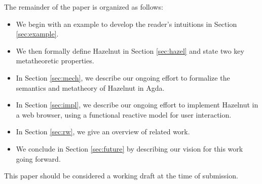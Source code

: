The remainder of the paper is organized as follows:
\begin{itemize}
  \item We begin with an example to develop the reader's intuitions in Section
    \ref{sec:example}.

  \item We then formally define Hazelnut in Section \ref{sec:hazel} and state two key metatheoretic properties.

  \item In Section \ref{sec:mech}, we describe our ongoing effort to formalize the semantics and metatheory of Hazelnut in Agda.

  \item In Section \ref{sec:impl}, we describe our ongoing effort to implement Hazelnut in a web browser, using a functional reactive model for user interaction.
  \item In Section \ref{sec:rw}, we give an overview of related work.
  \item We conclude in Section \ref{sec:future} by describing our vision for this work going 
    forward.
\end{itemize}

This paper should be considered a working draft at the time of submission.
